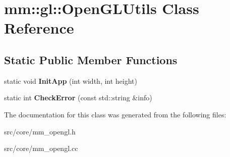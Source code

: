 \hypertarget{classmm_1_1gl_1_1_open_g_l_utils}{}\section{mm\+:\+:gl\+:\+:Open\+G\+L\+Utils Class Reference}
\label{classmm_1_1gl_1_1_open_g_l_utils}
\subsection*{Static Public Member Functions}
\begin{DoxyCompactItemize}
\item 
\hypertarget{classmm_1_1gl_1_1_open_g_l_utils_a83b27497f82d2796fe91a113a1724f38}{}static void {\bfseries Init\+App} (int width, int height)\label{classmm_1_1gl_1_1_open_g_l_utils_a83b27497f82d2796fe91a113a1724f38}

\item 
\hypertarget{classmm_1_1gl_1_1_open_g_l_utils_a7e963accbafc9a53d7b7296e22eed275}{}static int {\bfseries Check\+Error} (const std\+::string \&info)\label{classmm_1_1gl_1_1_open_g_l_utils_a7e963accbafc9a53d7b7296e22eed275}

\end{DoxyCompactItemize}


The documentation for this class was generated from the following files\+:\begin{DoxyCompactItemize}
\item 
src/core/mm\+\_\+opengl.\+h\item 
src/core/mm\+\_\+opengl.\+cc\end{DoxyCompactItemize}
